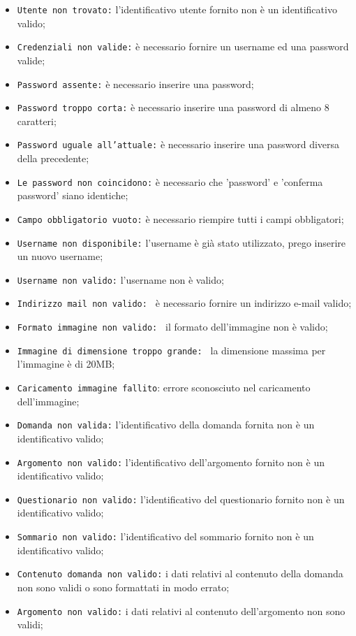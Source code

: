 \begin{itemize}
	\item \texttt{Utente non trovato:} l'identificativo utente fornito non è un identificativo valido;
	\item \texttt{Credenziali non valide:} è necessario fornire un username ed una password valide;
	\item \texttt{Password assente:} è necessario inserire una password;
	\item \texttt{Password troppo corta:} è necessario inserire una password di almeno 8 caratteri;
	\item \texttt{Password uguale all'attuale:} è necessario inserire una password diversa della precedente;
	\item \texttt{Le password non coincidono:} è necessario che 'password' e 'conferma password' siano identiche;
	\item \texttt{Campo obbligatorio vuoto:} è necessario riempire tutti i campi obbligatori;
	\item \texttt{Username non disponibile:} l'username è già stato utilizzato, prego inserire un nuovo username;
	\item \texttt{Username non valido:} l'username non è valido;
	\item \texttt{Indirizzo mail non valido: } è necessario fornire un indirizzo e-mail valido;
	\item \texttt{Formato immagine non valido: } il formato dell'immagine non è valido;
	\item \texttt{Immagine di dimensione troppo grande: } la dimensione massima per l'immagine è di 20MB;
	\item \texttt{Caricamento immagine fallito}: errore sconosciuto nel caricamento dell'immagine;
	\item \texttt{Domanda non valida:} l'identificativo della domanda fornita non è un identificativo valido;
	\item \texttt{Argomento non valido:} l'identificativo dell'argomento fornito non è un identificativo valido;
	\item \texttt{Questionario non valido:}  l'identificativo del questionario fornito non è un identificativo valido;
	\item \texttt{Sommario non valido:} l'identificativo del sommario fornito non è un identificativo valido;
	\item \texttt{Contenuto domanda non valido:} i dati relativi al contenuto della domanda non sono  validi o sono formattati in modo errato;
	\item \texttt{Argomento non valido:} i dati relativi al contenuto dell'argomento non sono validi;

\end{itemize}
